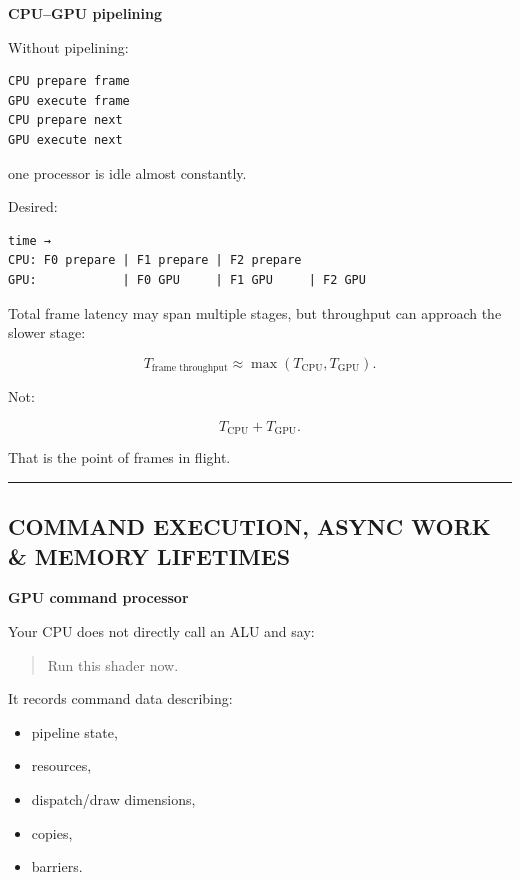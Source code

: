 \textbf{CPU--GPU pipelining}

Without pipelining:

\protect{}\label{p10-serialized}%
\begin{verbatim}
CPU prepare frame
GPU execute frame
CPU prepare next
GPU execute next
\end{verbatim}

one processor is idle almost constantly.

Desired:

\protect{}\label{p10-pipeline}%
\begin{verbatim}
time →
CPU: F0 prepare | F1 prepare | F2 prepare
GPU:            | F0 GPU     | F1 GPU     | F2 GPU
\end{verbatim}

Total frame latency may span multiple stages, but throughput can approach the slower stage:

\[
T_{\text{frame throughput}}
\approx
\max(
T_{\text{CPU}},
T_{\text{GPU}}
).
\]

Not:

\[
T_{\text{CPU}}+T_{\text{GPU}}.
\]

That is the point of frames in flight.

\begin{center}\rule{0.5\linewidth}{0.5pt}\end{center}

\subsection{COMMAND EXECUTION, ASYNC WORK \& MEMORY LIFETIMES}\label{05-engine-i-ch019-command-execution-async-work-memory-lifetimes}

\textbf{GPU command processor}

Your CPU does not directly call an ALU and say:

\begin{quote}
Run this shader now.
\end{quote}

It records command data describing:

\begin{itemize}
\tightlist
\item
  pipeline state,
\item
  resources,
\item
  dispatch/draw dimensions,
\item
  copies,
\item
  barriers.
\end{itemize}


